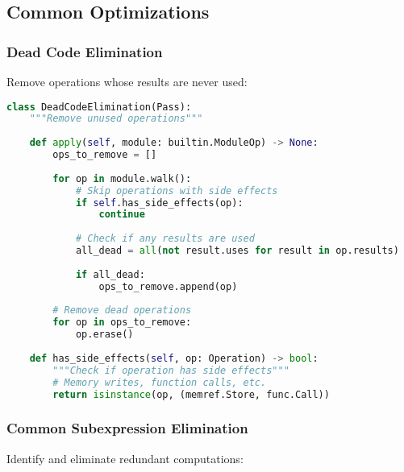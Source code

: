 \documentclass[11pt,a4paper]{article}
\begin{document}
\subsection{Common Optimizations}

\subsubsection{Dead Code Elimination}

Remove operations whose results are never used:

\begin{lstlisting}[language=Python, caption=Dead Code Elimination]
class DeadCodeElimination(Pass):
    """Remove unused operations"""
    
    def apply(self, module: builtin.ModuleOp) -> None:
        ops_to_remove = []
        
        for op in module.walk():
            # Skip operations with side effects
            if self.has_side_effects(op):
                continue
                
            # Check if any results are used
            all_dead = all(not result.uses for result in op.results)
            
            if all_dead:
                ops_to_remove.append(op)
        
        # Remove dead operations
        for op in ops_to_remove:
            op.erase()
    
    def has_side_effects(self, op: Operation) -> bool:
        """Check if operation has side effects"""
        # Memory writes, function calls, etc.
        return isinstance(op, (memref.Store, func.Call))
\end{lstlisting}

\subsubsection{Common Subexpression Elimination}

Identify and eliminate redundant computations:
\end{document}
